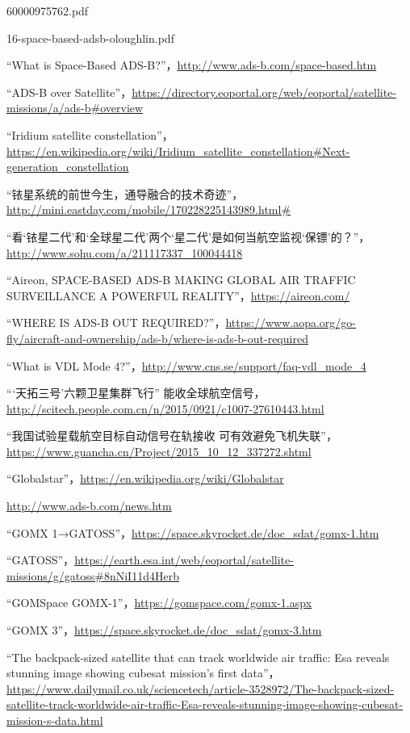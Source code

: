 \begin{thebibliography}{99}
 60000975762.pdf

 16-space-based-adsb-oloughlin.pdf


“What is Space-Based ADS-B?”，\url{http://www.ads-b.com/space-based.htm}

“ADS-B over Satellite”，\url{https://directory.eoportal.org/web/eoportal/satellite-missions/a/ads-b#overview}

“Iridium satellite constellation”，\url{https://en.wikipedia.org/wiki/Iridium_satellite_constellation#Next-generation_constellation}

“铱星系统的前世今生，通导融合的技术奇迹”，\url{http://mini.eastday.com/mobile/170228225143989.html#}

“看‘铱星二代’和‘全球星二代’两个‘星二代’是如何当航空监视‘保镖’的？”，\url{http://www.sohu.com/a/211117337_100044418}

“Aireon, SPACE-BASED ADS-B MAKING GLOBAL AIR TRAFFIC SURVEILLANCE A POWERFUL REALITY”，\url{https://aireon.com/}

“WHERE IS ADS-B OUT REQUIRED?”，\url{https://www.aopa.org/go-fly/aircraft-and-ownership/ads-b/where-is-ads-b-out-required}

“What is VDL Mode 4?”，\url{http://www.cns.se/support/faq-vdl_mode_4}

“‘天拓三号’六颗卫星集群飞行” 能收全球航空信号，\url{http://scitech.people.com.cn/n/2015/0921/c1007-27610443.html}

“我国试验星载航空目标自动信号在轨接收 可有效避免飞机失联”，\url{https://www.guancha.cn/Project/2015_10_12_337272.shtml}

“Globalstar”，\url{https://en.wikipedia.org/wiki/Globalstar}

\url{http://www.ads-b.com/news.htm}

“GOMX 1→GATOSS”，\url{https://space.skyrocket.de/doc_sdat/gomx-1.htm}

“GATOSS”，\url{https://earth.esa.int/web/eoportal/satellite-missions/g/gatoss#8nNiI11d4Herb}

“GOMSpace GOMX-1”，\url{https://gomspace.com/gomx-1.aspx}

“GOMX 3”，\url{https://space.skyrocket.de/doc_sdat/gomx-3.htm}

“The backpack-sized satellite that can track worldwide air traffic: Esa reveals stunning image showing cubesat mission's first data”，\url{https://www.dailymail.co.uk/sciencetech/article-3528972/The-backpack-sized-satellite-track-worldwide-air-traffic-Esa-reveals-stunning-image-showing-cubesat-mission-s-data.html}

\end{thebibliography}